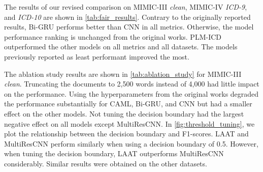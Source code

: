 {The results of our revised comparison on MIMIC-III \textit{clean}, MIMIC-IV \textit{ICD-9}, and \textit{ICD-10} are shown in \cref{tab:fair_results}. Contrary to the originally reported results, Bi-GRU performs better than CNN in all metrics. Otherwise, the model performance ranking is unchanged from the original works. PLM-ICD outperformed the other models on all metrics and all datasets. The models previously reported as least performant improved the most. 

The ablation study results are shown in \cref{tab:ablation_study} for MIMIC-III \textit{clean}. Truncating the documents to 2,500 words instead of 4,000 had little impact on the performance. Using the hyperparameters from the original works degraded the performance substantially for CAML, Bi-GRU, and CNN but had a smaller effect on the other models. Not tuning the decision boundary had the largest negative effect on all models except MultiResCNN. In \cref{fig:threshold_tuning}, we plot the relationship between the decision boundary and F1-scores. LAAT and MultiResCNN perform similarly when using a decision boundary of 0.5. However, when tuning the decision boundary, LAAT outperforms MultiResCNN considerably.
Similar results were obtained on the other datasets. 

\begin{sidewaystable}
    \centering
    \caption[Ablation study on MIMIC-III \textit{clean}.]{ Ablation study on MIMIC-III \textit{clean}. The numbers are the micro/macro F1-scores on the test set.}
    \label{tab:ablation_study}
\end{sidewaystable}


}
